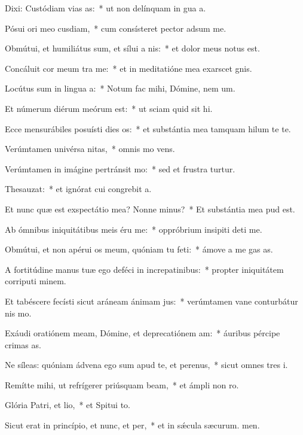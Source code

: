 \item Dixi: Custódiam vias as:~* ut non delínquam in gua a.
\item Pósui ori meo cusdiam,~* cum consísteret pector adsum me.
\item Obmútui, et humiliátus sum, et sílui a nis:~* et dolor meus notus est.
\item Concáluit cor meum tra me:~* et in meditatióne mea exarscet gnis.
\item Locútus sum in lingua a:~* Notum fac mihi, Dómine, nem um.
\item Et númerum diérum meórum  est:~* ut sciam quid sit hi.
\item Ecce mensurábiles posuísti dies os:~* et substántia mea tamquam hilum te te.
\item Verúmtamen univérsa nitas,~* omnis mo vens.
\item Verúmtamen in imágine pertránsit mo:~* sed et frustra turtur.
\item Thesauzat:~* et ignórat cui congrebit a.
\item Et nunc quæ est exspectátio mea? Nonne minus?~* Et substántia mea pud  est.
\item Ab ómnibus iniquitátibus meis éru me:~* oppróbrium insipiti deti me.
\item Obmútui, et non apérui os meum, quóniam tu feti:~* ámove a me gas as.
\item A fortitúdine manus tuæ ego deféci in increpatinibus:~* propter iniquitátem corriputi minem.
\item Et tabéscere fecísti sicut aráneam ánimam jus:~* verúmtamen vane conturbátur nis mo.
\item Exáudi oratiónem meam, Dómine, et deprecatiónem am:~* áuribus pércipe crimas as.
\item Ne síleas: quóniam ádvena ego sum apud te, et perenus,~* sicut omnes tres i.
\item Remítte mihi, ut refrígerer priúsquam beam,~* et ámpli non ro.
\item Glória Patri, et lio,~* et Spitui to.
\item Sicut erat in princípio, et nunc, et per,~* et in sǽcula sæcurum. men.

